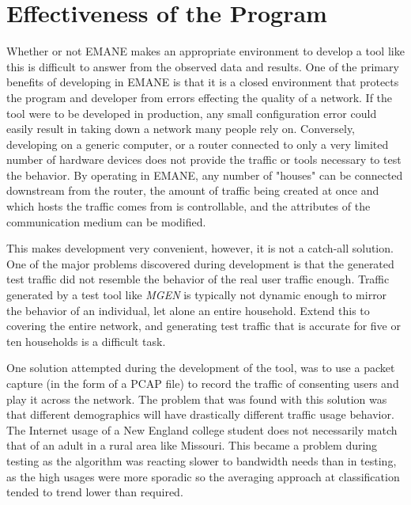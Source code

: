 \section{Effectiveness of the Program}
Whether or not EMANE makes an appropriate environment to develop a tool like this is difficult to answer from the observed data and results.
One of the primary benefits of developing in EMANE is that it is a closed environment that protects the program and developer from errors effecting the quality of a network.
If the tool were to be developed in production, any small configuration error could easily result in taking down a network many people rely on.
Conversely, developing on a generic computer, or a router connected to only a very limited number of hardware devices does not provide the traffic or tools necessary to test the behavior.
By operating in EMANE, any number of "houses" can be connected downstream from the router, the amount of traffic being created at once and which hosts the traffic comes from is controllable, and the attributes of the communication medium can be modified.\par
This makes development very convenient, however, it is not a catch-all solution.
One of the major problems discovered during development is that the generated test traffic did not resemble the behavior of the real user traffic enough.
Traffic generated by a test tool like \textit{MGEN} is typically not dynamic enough to mirror the behavior of an individual, let alone an entire household.
Extend this to covering the entire network, and generating test traffic that is accurate for five or ten households is a difficult task.\par
One solution attempted during the development of the tool, was to use a packet capture (in the form of a PCAP file) to record the traffic of consenting users and play it across the network.
The problem that was found with this solution was that different demographics will have drastically different traffic usage behavior.
The Internet usage of a New England college student does not necessarily match that of an adult in a rural area like Missouri.
This became a problem during testing as the algorithm was reacting slower to bandwidth needs than in testing, as the high usages were more sporadic so the averaging approach at classification tended to trend lower than required.\par

